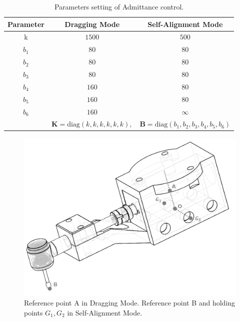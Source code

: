\begin{table}[htbp]
\centering
\caption{Parameters setting of Admittance control.}
\label{tab: para_adm}
\begin{tabular}{ccc} 
\hline \hline
Parameter	&Dragging Mode		&Self-Alignment Mode	\\
\hline
k			&$1500$				&$500$				\\
$b_1$		&$80$				&$80$					\\
$b_2$		&$80$				&$80$					\\
$b_3$		&$80$				&$80$					\\
$b_4$		&$160$				&$80$					\\
$b_5$		&$160$				&$80$					\\
$b_6$		&$160$				&$\infty$					\\
\hline	
&$\mathbf{K} = \text{diag}(k,k,k,k,k,k),$ &$\mathbf{B} = \text{diag}(b_1,b_2,b_3,b_4,b_5,b_6)$\\
\hline\hline	
\end{tabular}
\end{table}
\begin{figure}[htbp]
\begin{center}
\includegraphics[width=0.7\linewidth]{Images/holding_gesture.png}
\caption{
Reference point A in Dragging Mode. Reference point B and holding points $G_1,G_2$ in Self-Alignment Mode.
}\label{fig:holding gesture}
\end{center}
\end{figure}
\par
